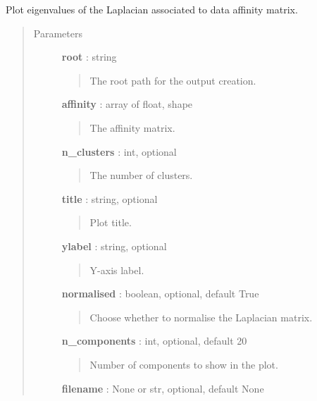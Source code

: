 \documentclass[letterpaper,10pt,english]{sphinxmanual}
\begin{document}

\begin{fulllineitems}
\label{index:adenine.core.plotting.eigs}
Plot eigenvalues of the Laplacian associated to data affinity matrix.
\begin{quote}\begin{description}
\item[{Parameters}] \leavevmode
\textbf{root} : string
\begin{quote}

The root path for the output creation.
\end{quote}

\textbf{affinity} : array of float, shape
\begin{quote}

The affinity matrix.
\end{quote}

\textbf{n\_clusters} : int, optional
\begin{quote}

The number of clusters.
\end{quote}

\textbf{title} : string, optional
\begin{quote}

Plot title.
\end{quote}

\textbf{ylabel} : string, optional
\begin{quote}

Y-axis label.
\end{quote}

\textbf{normalised} : boolean, optional, default True
\begin{quote}

Choose whether to normalise the Laplacian matrix.
\end{quote}

\textbf{n\_components} : int, optional, default 20
\begin{quote}

Number of components to show in the plot.
\end{quote}

\textbf{filename} : None or str, optional, default None
\begin{quote}


\end{quote}
\end{description}
\end{quote}
\end{fulllineitems}
\end{document}
